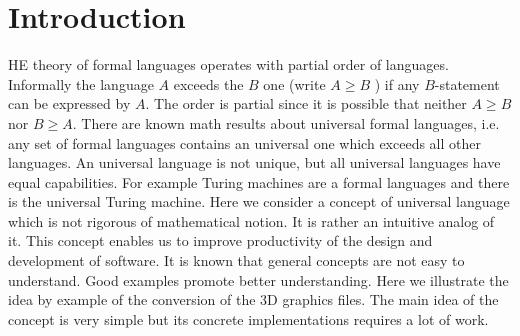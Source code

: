 \documentclass[10pt,journal,compsoc]{IEEEtran}
\begin{document}
	
	\ifCLASSOPTIONcompsoc
	\else
	\section{Introduction}
	\label{sec:introduction}
	\fi
	
	
	
	
	HE theory of formal languages operates with partial order of languages.  Informally the language $A$ exceeds the  $B$ one (write $A \ge B$ ) if any $B$-statement can be expressed by  $A$.  The order is partial since it is possible that neither $A \ge B$ nor $B\ge A$. There are known math results about universal formal languages, i.e. any set of formal languages contains an universal one which exceeds all other languages. An universal language is not unique, but all universal languages have equal capabilities. For example  Turing machines are a formal languages and there is the universal Turing machine. Here we consider a concept of  universal language which is not rigorous of mathematical notion. It is rather an intuitive analog of it. This concept enables us to improve productivity of the design and development of software. It is known that general concepts are not easy to understand. Good examples promote better understanding. Here we illustrate the idea by example of the conversion of the 3D graphics files. The main idea of the concept is very simple but its concrete implementations requires a lot of work.
\end{document}
